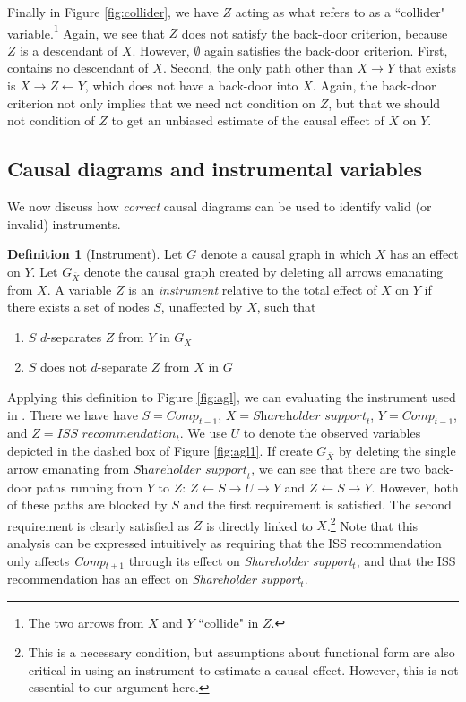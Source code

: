 \documentclass[12pt,reqno,titlepage]{amsart}
\theoremstyle{definition}
\newtheorem{definition}{Definition}
\begin{document}
Finally in Figure \ref{fig:collider}, we have $Z$ acting as what \citet[p.\,17]{Pearl:2009kh} refers to as a ``collider" variable.\footnote{
The two arrows from $X$ and $Y$ ``collide" in $Z$.} 
Again, we see that $Z$ does not satisfy the back-door criterion, because $Z$ is a descendant of $X$.
However, $\emptyset$ again satisfies the back-door criterion.
First, contains no descendant of $X$.
Second, the only path other than $X \rightarrow Y$ that exists is $X \rightarrow Z \leftarrow Y$, which does not have a back-door into $X$.
Again, the back-door criterion not only implies that we need not condition on $Z$, but that we should not condition of $Z$ to get an unbiased estimate of the causal effect of $X$ on $Y$.

\subsection{Causal diagrams and instrumental variables}

We now discuss how \emph{correct} causal diagrams can be used to identify valid (or invalid) instruments.
 

\begin{definition}[Instrument]
Let $G$ denote a causal graph in which $X$ has an effect on $Y$. 
Let $G_{\overline{X}}$ denote the causal graph created by deleting all arrows emanating from $X$.
A variable $Z$ is an \emph{instrument} relative to the total effect of $X$ on $Y$ if there exists a set of nodes $S$, unaffected by $X$, such that
\begin{enumerate}
\item $S$ $d$-separates $Z$ from $Y$ in $G_{\overline{X}}$
\item $S$ does not $d$-separate $Z$ from $X$ in $G$
\end{enumerate}
\end{definition}

Applying this definition to Figure \ref{fig:agl}, we can evaluating the instrument used in \citet{Armstrong:2013io}.
There we have have $S = \textit{Comp}_{t-1}$,
$X =\textit{Shareholder support}_{t}$, $Y = \textit{Comp}_{t-1}$, and $Z = \textit{ISS recommendation}_{t}$.
We use $U$ to denote the observed variables depicted in the dashed box of Figure \ref{fig:agl1}.
If create $G_{\overline{X}}$ by deleting the single arrow emanating from $\textit{Shareholder support}_{t}$, we can see that there are two back-door paths running from $Y$ to $Z$: 
$Z \leftarrow S \rightarrow U \rightarrow Y$ and $Z \leftarrow S \rightarrow Y$.
However, both of these paths are blocked by $S$ and the first requirement is satisfied.
The second requirement is clearly satisfied as $Z$ is directly linked to $X$.\footnote{
This is a necessary condition, but assumptions about functional form are also critical in using an instrument to estimate a causal effect.
However, this is not essential to our argument here.}
%
Note that this analysis can be expressed intuitively as requiring that the ISS recommendation only affects \textit{Comp}$_{t+1}$ through its effect on \textit{Shareholder support}$_{t}$, and that the ISS recommendation has an effect on \textit{Shareholder support}$_{t}$.
\end{document}
